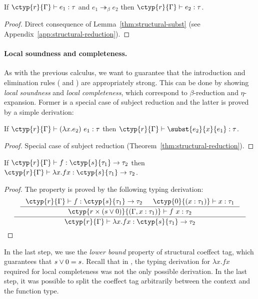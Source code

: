 \begin{theorem}
\label{thm:structural-reduction}
If $\ctyp{r}{\Gamma} \vdash e_1 : \tau$ and $e_1 \twoheadrightarrow_\beta e_2$ then 
$\ctyp{r}{\Gamma} \vdash e_2 : \tau$.
\end{theorem}
\begin{proof}
Direct consequence of Lemma~\ref{thm:structural-subst} (see Appendix~\ref{app:structural-reduction}).
\end{proof}

\paragraph{Local soundness and completeness.}
As with the previous calculus, we want to guarantee that the introduction and
elimination rules ( and ) are appropriately strong. 
This can be done by showing \emph{local soundness} and \emph{local completeness},
which correspond to $\beta$-reduction and $\eta$-expansion. Former is a special
case of subject reduction and the latter is proved by a simple derivation:
%
\begin{theorem}
If $\ctyp{r}{\Gamma} \vdash (\lambda x.e_2)~e_1 : \tau$ then
$\ctyp{r}{\Gamma} \vdash \subst{e_2}{x}{e_1} : \tau$.
\end{theorem}
\begin{proof}
Special case of subject reduction (Theorem~\ref{thm:structural-reduction}).
\end{proof}
%
\begin{theorem}
If $\ctyp{r}{\Gamma} \vdash f : \ctyp{s}{\tau_1} \rightarrow \tau_2$ then
$\ctyp{r}{\Gamma} \vdash \lambda x.f x : \ctyp{s}{\tau_1} \rightarrow \tau_2$.
\end{theorem}
\begin{proof} The property is proved by the following typing derivation:
%
\begin{equation*}
\inference
  {\inference
     {\ctyp{r}{\Gamma} \vdash f : \ctyp{s}{\tau_1} \rightarrow \tau_2 &
      \ctyp{0}{(x:\tau_1)} \vdash x : \tau_1 }
     {\ctyp{r \csprd (s \csvop 0)}{(\Gamma, x:\tau_1)} \vdash f~x : \tau_2}}
  {\ctyp{r}{\Gamma} \vdash \lambda x.f x : \ctyp{s}{\tau_1} \rightarrow \tau_2 }
\qedhere
\end{equation*}
\end{proof}
%
In the last step, we use the \emph{lower bound} property of structural coeffect tag, which
guarantees that $s\vee0 = s$. Recall that in \clflt, the typing derivation for
$\lambda x.f x$ required for local completeness was not the only possible derivation.
In the last step, it was possible to split the coeffect tag arbitrarily between the 
context and the function type. 

